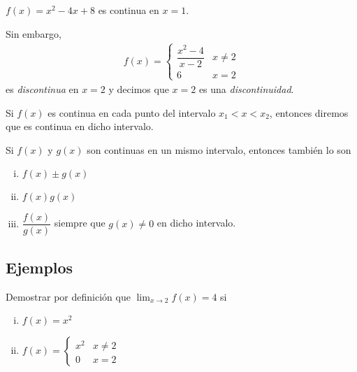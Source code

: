  \begin{problema}
   $f(x)=x^{2}-4x+8$ es continua en $x=1$.
  \end{problema}


  \begin{problema}
   Sin embargo, 
   \begin{align}
   f(x)=
    \begin{cases}
\dfrac{x^2-4}{x-2}& x\neq 2\\
6 & x= 2
\end{cases}
    \end{align}
    es \emph{discontinua} en $x=2$  y decimos que $x=2$ es una \emph{discontinuidad}.
  \end{problema}


{}
  Si $f(x)$ es continua en cada punto del intervalo $x_{1}<x<x_{2}$, entonces diremos que es continua en dicho intervalo.

{}
  \begin{prop}
   Si $f(x)$ y $g(x)$ son continuas en un mismo intervalo, entonces también lo son
   \begin{enumerate}[(i)]
     \item $f(x)\pm g(x)$ 
     
     \item $f(x)g(x)$
     
     \item $\dfrac{f(x)}{g(x)}$ siempre que $g(x)\neq 0$ en dicho intervalo.
\end{enumerate}
  \end{prop}


\subsection{Ejemplos}
{}
  \begin{problema}
   Demostrar por definición que $\lim_{x\to 2}f(x)=4$ si
   \begin{enumerate}[(i)]
     \item $f(x)=x^{2}$ 
     
     \item $f(x)= \begin{cases}
x^{2} & x\neq 2 \\
0 & x =2
\end{cases}$
\end{enumerate}
  \end{problema}


